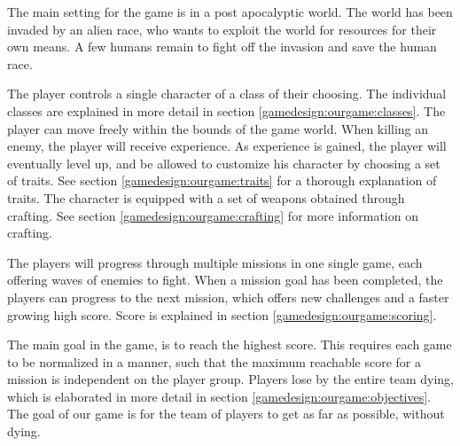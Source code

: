 
The main setting for the game is in a post apocalyptic world.
The world has been invaded by an alien race, who wants to exploit the world for resources for their own means.
A few humans remain to fight off the invasion and save the human race.

The player controls a single character of a class of their choosing. The individual classes are explained in more detail in section \ref{gamedesign:ourgame:classes}.
The player can move freely within the bounds of the game world.
When killing an enemy, the player will receive experience.
As experience is gained, the player will eventually level up, and be allowed to customize his character by choosing a set of traits. See section \ref{gamedesign:ourgame:traits} for a thorough explanation of traits.
The character is equipped with a set of weapons obtained through crafting. See section \ref{gamedesign:ourgame:crafting} for more information on crafting.

The players will progress through multiple missions in one single game, each offering waves of enemies to fight.
When a mission goal has been completed, the players can progress to the next mission, which offers new challenges and a faster growing high score. Score is explained in section \ref{gamedesign:ourgame:scoring}.

The main goal in the game, is to reach the highest score. 
This requires each game to be normalized in a manner, such that the maximum reachable score for a mission is independent on the player group.
Players lose by the entire team dying, which is elaborated in more detail in section \ref{gamedesign:ourgame:objectives}.
The goal of our game is for the team of players to get as far as possible, without dying.




